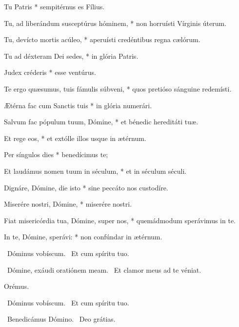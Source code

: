 Tu Patris * sempitérnus es Fílius.

Tu, ad liberándum susceptúrus hóminem, * non horruísti Vírginis úterum.

Tu, devícto mortis acúleo, * aperuísti credéntibus regna cælórum.

Tu ad déxteram Dei sedes, * in glória Patris.

Judex créderis * esse ventúrus.


Te ergo quæsumus, tuis fámulis súbveni, * quos pretióso sánguine redemísti.

Ætérna fac cum Sanctis tuis * in glória numerári.

Salvum fac pópulum tuum, Dómine, * et bénedic hereditáti tuæ.

Et rege eos, * et extólle illos usque in ætérnum.

Per síngulos dies * benedícimus te;

Et laudámus nomen tuum in séculum, * et in séculum séculi.

Dignáre, Dómine, die isto * sine peccáto nos custodíre.

Miserére nostri, Dómine, * miserére nostri.

Fiat misericórdia tua, Dómine, super nos, * quemádmodum sperávimus in te.

In te, Dómine, sperávi: * non confúndar in ætérnum.



\V\ Dóminus vobíscum. \R\ Et cum spíritu tuo.


\V\ Dómine, exáudi oratiónem meam. \R\ Et clamor meus ad te véniat.

Orémus.



\V\ Dóminus vobíscum. \R\ Et cum spíritu tuo.

\V\ Benedicámus Dómino. \R\ Deo grátias.

